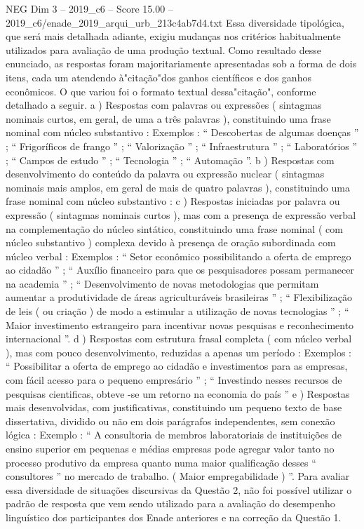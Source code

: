 \begin{textsample}{NEG Dim 3 – 2019\_c6 – Score 15.00 – 2019\_c6/enade\_2019\_arqui\_urb\_213c4ab7d4.txt}
Essa diversidade tipológica, que será mais detalhada adiante, exigiu mudanças nos critérios habitualmente utilizados para avaliação de uma produção textual.
Como resultado desse enunciado, as respostas foram majoritariamente apresentadas sob a forma de dois itens, cada um atendendo à"citação"dos ganhos científicos e dos ganhos econômicos.
O que variou foi o formato textual dessa"citação", conforme detalhado a seguir. a ) Respostas com palavras ou expressões ( sintagmas nominais curtos, em geral, de uma a três palavras ), constituindo uma frase nominal com núcleo substantivo : Exemplos : “ Descobertas de algumas doenças ” ; “ Frigoríficos de frango ” ; “ Valorização ” ; “ Infraestrutura ” ; “ Laboratórios ” ; “ Campos de estudo ” ; “ Tecnologia ” ; “ Automação ”. b ) Respostas com desenvolvimento do conteúdo da palavra ou expressão nuclear ( sintagmas nominais mais amplos, em geral de mais de quatro palavras ), constituindo uma frase nominal com núcleo substantivo : c ) Respostas iniciadas por palavra ou expressão ( sintagmas nominais curtos ), mas com a presença de expressão verbal na complementação do núcleo sintático, constituindo uma frase nominal ( com núcleo substantivo ) complexa devido à presença de oração subordinada com núcleo verbal : Exemplos : “ Setor econômico possibilitando a oferta de emprego ao cidadão ” ; “ Auxílio financeiro para que os pesquisadores possam permanecer na academia ” ; “ Desenvolvimento de novas metodologias que permitam aumentar a produtividade de áreas agriculturáveis brasileiras ” ; “ Flexibilização de leis ( ou criação ) de modo a estimular a utilização de novas tecnologias ” ; “ Maior investimento estrangeiro para incentivar novas pesquisas e reconhecimento internacional ”. d ) Respostas com estrutura frasal completa ( com núcleo verbal ), mas com pouco desenvolvimento, reduzidas a apenas um período : Exemplos : “ Possibilitar a oferta de emprego ao cidadão e investimentos para as empresas, com fácil acesso para o pequeno empresário ” ; “ Investindo nesses recursos de pesquisas cientificas, obteve -se um retorno na economia do país ” e ) Respostas mais desenvolvidas, com justificativas, constituindo um pequeno texto de base dissertativa, dividido ou não em dois parágrafos independentes, sem conexão lógica : Exemplo : “ A consultoria de membros laboratoriais de instituições de ensino superior em pequenas e médias empresas pode agregar valor tanto no processo produtivo da empresa quanto numa maior qualificação desses “ consultores ” no mercado de trabalho. ( Maior empregabilidade ) ”.
Para avaliar essa diversidade de situações discursivas da Questão 2, não foi possível utilizar o padrão de resposta que vem sendo utilizado para a avaliação do desempenho linguístico dos participantes dos Enade anteriores e na correção da Questão 1.

\end{textsample}

